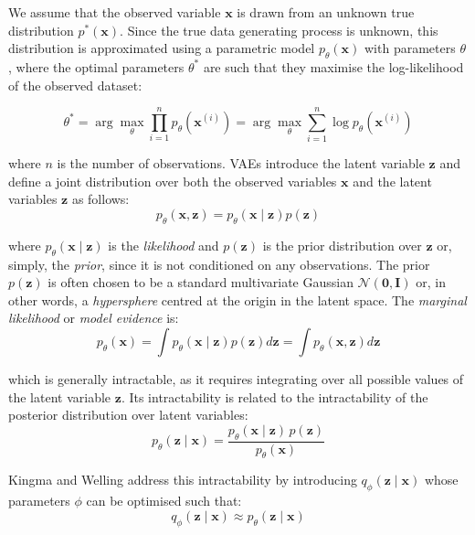 \documentclass[Main.tex]{subfiles}
\begin{document}
We assume that the observed variable $\mathbf{x}$ is drawn from an unknown true distribution $p^{*}(\mathbf{x})$. Since the true data generating process is unknown, this distribution is approximated using a parametric model $p_\theta(\mathbf{x})$ with parameters $\theta$, where the optimal parameters $\theta^*$ are such that they maximise the log-likelihood of the observed dataset:

\begin{equation}
\theta^{*} = \arg\max_{\theta} \prod_{i=1}^{n} p_\theta(\mathbf{x}^{(i)}) =\arg\max_{\theta} \sum_{i=1}^{n} \log p_\theta(\mathbf{x}^{(i)})
\end{equation}

where $n$ is the number of observations. VAEs introduce the latent variable $\mathbf{z}$ and define a joint distribution over both the observed variables $\mathbf{x}$ and the latent variables $\mathbf{z}$ as follows:
\begin{equation}
p_\theta(\mathbf{x}, \mathbf{z}) = p_\theta(\mathbf{x} \mid \mathbf{z}) p(\mathbf{z})
\end{equation}

where \(p_\theta(\mathbf{x} \mid \mathbf{z})\) is the \textit{likelihood} and $p(\mathbf{z})$ is the prior distribution over $\mathbf{z}$ or, simply, the \textit{prior}, since it is not conditioned on any observations. The prior $p(\mathbf{z})$ is often chosen to be a standard multivariate Gaussian $\mathcal{N}(\boldsymbol{0}, \mathbf{I})$ or, in other words, a \textit{hypersphere} centred at the origin in the latent space. The \textit{marginal likelihood} or \textit{model evidence} is:
\begin{equation}
p_\theta(\mathbf{x}) = \int p_\theta(\mathbf{x} \mid \mathbf{z}) p(\mathbf{z}) d\mathbf{z} = \int p_\theta(\mathbf{x}, \mathbf{z}) d\mathbf{z}
\end{equation}

which is generally intractable, as it requires integrating over all possible values of the latent variable $\mathbf{z}$. Its intractability is related to the intractability of the posterior distribution over latent variables:
\begin{equation}
p_\theta(\mathbf{z} \mid \mathbf{x})
=
\frac{p_\theta(\mathbf{x} \mid \mathbf{z}) \, p(\mathbf{z})}
{p_\theta(\mathbf{x})}
\end{equation}

Kingma and Welling \cite{kingma_auto-encoding_2022} address this intractability by introducing $q_\phi(\mathbf{z} \mid \mathbf{x})$ whose parameters $\phi$ can be optimised such that:
\begin{equation}
q_\phi(\mathbf{z} \mid \mathbf{x}) \approx p_\theta(\mathbf{z} \mid \mathbf{x})
\end{equation}
\end{document}
